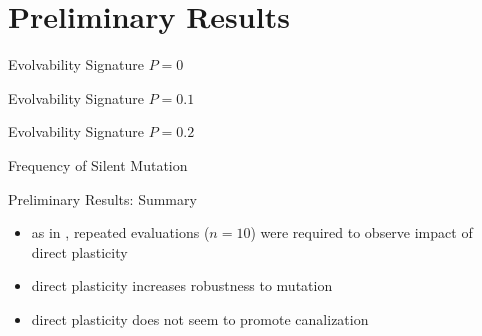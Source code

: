 \section{Preliminary Results}

\begin{frame}{Evolvability Signature $P=0$}

\end{frame}

\begin{frame}{Evolvability Signature $P=0.1$}

\end{frame}

\begin{frame}{Evolvability Signature $P=0.2$}

\end{frame}

\begin{frame}{Frequency of Silent Mutation}

\end{frame}

\begin{frame}{Preliminary Results: Summary}
\begin{itemize}
  \item as in \cite{Reisinger2005TowardsEvolvability}, repeated evaluations ($n=10$) were required to observe impact of direct plasticity
  \item direct plasticity increases robustness to mutation
  \item direct plasticity does not seem to promote canalization 
\end{itemize}
\end{frame}